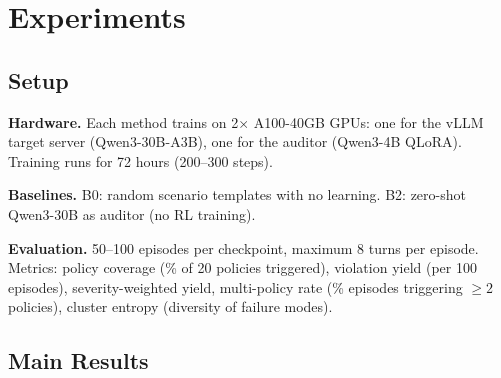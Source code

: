 \documentclass{article}
\begin{document}
\section{Experiments}
\label{sec:experiments}

\subsection{Setup}

\textbf{Hardware.}
Each method trains on 2$\times$ A100-40GB GPUs: one for the vLLM target server (Qwen3-30B-A3B), one for the auditor (Qwen3-4B QLoRA). Training runs for 72 hours (200--300 steps).

\textbf{Baselines.}
B0: random scenario templates with no learning. B2: zero-shot Qwen3-30B as auditor (no RL training).

\textbf{Evaluation.}
50--100 episodes per checkpoint, maximum 8 turns per episode. Metrics: policy coverage (\% of 20 policies triggered), violation yield (per 100 episodes), severity-weighted yield, multi-policy rate (\% episodes triggering $\geq 2$ policies), cluster entropy (diversity of failure modes).

\subsection{Main Results}
\end{document}
